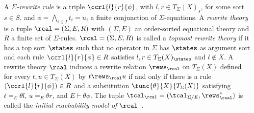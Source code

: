 
A {\em $\Sigma$-rewrite rule} is a triple $\ccrl{l}{r}{\phi}$, with
$l,r \in T_\Sigma(X)_s$, for some sort $s \in S$, and $\phi =
\bigwedge_{i\in I} t_i = u_i$ a finite conjunction of
$\Sigma$-equations.  A {\em rewrite theory} is a tuple $\rcal =
(\Sigma,E,R)$ with $(\Sigma,E)$ an order-sorted equational theory and
$R$ a finite set of $\Sigma$-rules.  $\rcal = (\Sigma,E,R)$ is called
a {\em topmost rewrite theory} if it has a top sort $\states$ such
that no operator in $\Sigma$ has $\states$ as argument sort and each
rule $\ccrl{l}{r}{\phi}\in R$ satisfies $l,r \in T_\Sigma(X)_\states$
and $l \notin X$.  A rewrite theory $\rcal$ induces a rewrite relation
$\rews_{\rcal}$ on $T_{\Sigma}(X)$ defined for every $t,u \in
T_\Sigma(X)$ by $t \rews_\rcal u$ if and only if there is a rule
$(\ccrl{l}{r}{\phi}) \in R$ and a substitution
$\func{\theta}{X}{T_\Sigma(X)}$ satisfying $t =_E \theta l$, $u =_E
\theta r$, and $E \vdash \theta \phi$. The tuple $\tcal_\rcal =
(\tcal_{\Sigma/E},\rews_\rcal^*)$ is called the {\em initial
  reachability model of $\rcal$}~\cite{bruni-semgenrewths-2006}.

